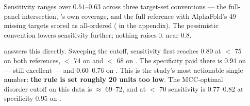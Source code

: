 \begin{table}[t]
    \centering
    \small
    \caption{Clause tests for \plddtrule on \plddt's own target coverage. ``Content'' is the
    fraction of evaluated residues that are disordered. Specificity 95\% CIs are
    [0.981, 0.990], [0.618, 0.727], [0.966, 0.989] and [0.696, 0.825] respectively.
    Sensitivity never approaches 0.8; specificity is decided by the reference convention.}
    \label{tab:clause}
\end{table}

 Sensitivity ranges over $0.51$--$0.63$
across three target-set conventions --- the full-panel intersection, \plddt's own coverage, and
the full reference with AlphaFold's 49 missing \caidtwo targets scored as all-ordered
( in the appendix). The pessimistic convention lowers sensitivity
further; nothing raises it near 0.8.

  answers this directly. Sweeping the
cutoff, sensitivity first reaches 0.80 at \plddt $<$ 75 on both \caidtwo references, \plddt
$<$ 74 on \caidthree \dpdb and \plddt $<$ 68 on \caidthree \dnox. The specificity paid there is
0.94 on \dpdb --- still excellent --- and 0.60--0.76 on \dnox. This is the study's most
actionable single number: \textbf{the rule is set roughly 20 \plddt units too low}. The
MCC-optimal disorder cutoff on this data is \plddt $\approx$ 69--72, and at \plddt $<$ 70
sensitivity is 0.77--0.82 at specificity 0.95 on \dpdb.

